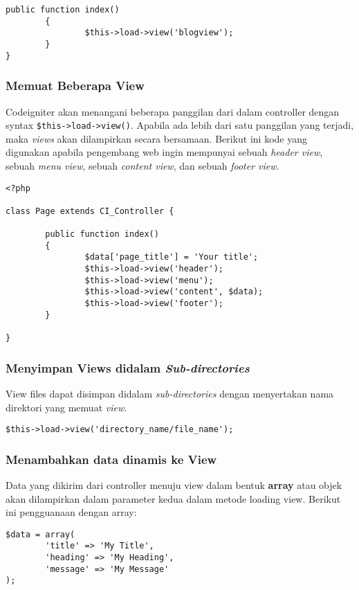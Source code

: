 \begin{enumerate}
\begin{lstlisting}[label=phpheg, frame=single]
        public function index()
        {
                $this->load->view('blogview');
        }
}
\end{lstlisting}

\subsubsection{Memuat Beberapa View}
\label{sssec:view_2}
Codeigniter akan menangani beberapa panggilan dari dalam controller dengan syntax \verb|$this->load->view()|. Apabila ada lebih dari satu panggilan yang terjadi, maka \textit{views} akan dilampirkan secara bersamaan. Berikut ini kode yang digunakan apabila pengembang web ingin mempunyai sebuah \textit{header view}, sebuah \textit{menu view}, sebuah \textit{content view}, dan sebuah \textit{footer view}. 
\begin{lstlisting}[label=phpheg, frame=single] 
<?php

class Page extends CI_Controller {

        public function index()
        {
                $data['page_title'] = 'Your title';
                $this->load->view('header');
                $this->load->view('menu');
                $this->load->view('content', $data);
                $this->load->view('footer');
        }

}
\end{lstlisting}

\subsubsection{Menyimpan Views didalam \textit{Sub-directories}}
\label{sssec:view_3}
View files dapat disimpan didalam \textit{sub-directories} dengan menyertakan nama direktori yang memuat \textit{view}.
\begin{lstlisting}[label=phpheg, frame=single] 
$this->load->view('directory_name/file_name');
\end{lstlisting}

\subsubsection{Menambahkan data dinamis ke View}
\label{sssec:view_4}
Data yang dikirim dari controller menuju view dalam bentuk \textbf{array} atau objek akan dilampirkan dalam parameter kedua dalam metode loading view. 
Berikut ini pengguanaan dengan array:
\begin{lstlisting}[label=phpheg, frame=single] 
$data = array(
        'title' => 'My Title',
        'heading' => 'My Heading',
        'message' => 'My Message'
);


\end{lstlisting}
\end{enumerate}
